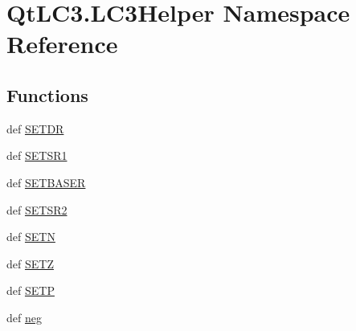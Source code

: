 \hypertarget{namespace_qt_l_c3_1_1_l_c3_helper}{\section{Qt\-L\-C3.\-L\-C3\-Helper Namespace Reference}
\label{namespace_qt_l_c3_1_1_l_c3_helper}
}
\subsection*{Functions}
\begin{DoxyCompactItemize}
\item 
def \hyperlink{namespace_qt_l_c3_1_1_l_c3_helper_ae7cb9e4899acd35e8916ea0b1f2cfd72}{S\-E\-T\-D\-R}
\item 
def \hyperlink{namespace_qt_l_c3_1_1_l_c3_helper_a3864324a32466dcc102bc13bbd16bb68}{S\-E\-T\-S\-R1}
\item 
def \hyperlink{namespace_qt_l_c3_1_1_l_c3_helper_a922cbc23ef2e88f72e3ffb8823b3448e}{S\-E\-T\-B\-A\-S\-E\-R}
\item 
def \hyperlink{namespace_qt_l_c3_1_1_l_c3_helper_a89ace97b16bf0b0cf2f2d5ccc0a7d041}{S\-E\-T\-S\-R2}
\item 
def \hyperlink{namespace_qt_l_c3_1_1_l_c3_helper_aa3a2d3ee10a9fb5f5638cc4a8c2636f5}{S\-E\-T\-N}
\item 
def \hyperlink{namespace_qt_l_c3_1_1_l_c3_helper_a1046fcb8930de46a28d181523a37ed12}{S\-E\-T\-Z}
\item 
def \hyperlink{namespace_qt_l_c3_1_1_l_c3_helper_a185a0d60d8df4193d5eef92513b34b65}{S\-E\-T\-P}
\item 
def \hyperlink{namespace_qt_l_c3_1_1_l_c3_helper_a66561d57b2b0ccc464240f7983019ef7}{neg}
\end{DoxyCompactItemize}
